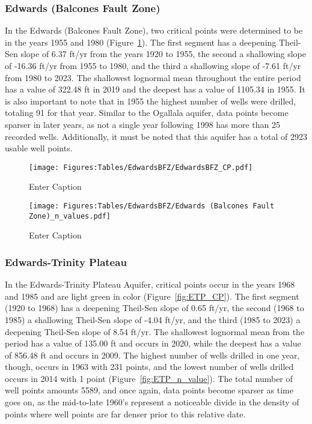 \subsubsection*{Edwards (Balcones Fault Zone)}
In the Edwards (Balcones Fault Zone), two critical points were determined to be in the years 1955 and 1980 (Figure~\ref{fig:EBFZ_CP}). The first segment has a deepening Theil-Sen slope of 6.37 ft/yr from the years 1920 to 1955, the second a shallowing slope of -16.36 ft/yr from 1955 to 1980, and the third a shallowing slope of -7.61 ft/yr from 1980 to 2023.  The shallowest lognormal mean throughout the entire period has a value of 322.48 ft in 2019 and the deepest has a value of 1105.34 in 1955. It is also important to note that in 1955 the highest number of wells were drilled, totaling 91 for that year. Similar to the Ogallala aquifer, data points become sparser in later years, as not a single year following 1998 has more than 25 recorded wells. Additionally, it must be noted that this aquifer has a total of 2923 usable well points.
\begin{figure}[H]
    \centering
    \texttt{[image: Figures:Tables/EdwardsBFZ/EdwardsBFZ\_CP.pdf]}
    \caption{Enter Caption}
    \label{fig:EBFZ_CP}
\end{figure}
\begin{figure}[H]
    \centering
    \texttt{[image: Figures:Tables/EdwardsBFZ/Edwards (Balcones Fault Zone)\_n\_values.pdf]}
    \caption{Enter Caption}
    \label{fig:EBFZ_n_value}
\end{figure}

\subsubsection*{Edwards-Trinity Plateau}
In the Edwards-Trinity Plateau Aquifer, critical points occur in the years 1968 and 1985 and are light green in color (Figure~\ref{fig:ETP_CP}). The first segment (1920 to 1968) has a deepening Theil-Sen slope of 0.65 ft/yr, the second (1968 to 1985) a shallowing Theil-Sen slope of -4.04 ft/yr, and the third (1985 to 2023) a deepening Theil-Sen slope of 8.54 ft/yr. The shallowest lognormal mean from the period has a value of 135.00 ft and occurs in 2020, while the deepest has a value of 856.48 ft and occurs in 2009. The highest number of wells drilled in one year, though, occurs in 1963 with 231 points, and the lowest number of wells drilled occurs in 2014 with 1 point (Figure~\ref{fig:ETP_n_value}). The total number of well points amounts 5589, and once again, data points become sparser as time goes on, as the mid-to-late 1960’s represent a noticeable divide in the density of points where well points are far denser prior to this relative date.

